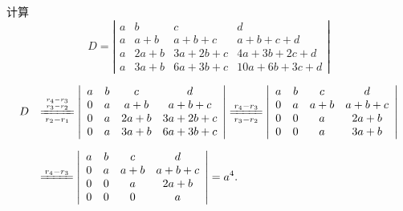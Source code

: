 \begin{li}
  计算
  $$
  D = \left |
    \begin{array}{cccc}
      a &    b &       c &           d  \\
      a &  a+b &   a+b+c &     a+b+c+d  \\
      a & 2a+b & 3a+2b+c &  4a+3b+2c+d  \\
      a & 3a+b & 6a+3b+c & 10a+6b+3c+d   
    \end{array}
  \right|
  $$
\end{li}
\begin{jie}
  $$
  \begin{array}{ll}
    D &  \ds \xlongequal[r_2-r_1]{r_4-r_3\atop r_3-r_2}
        \left |
        \begin{array}{cccc}
          a &    b &     c &         d  \\
          0 &    a &   a+b &     a+b+c  \\
          0 &    a &  2a+b &   3a+2b+c  \\
          0 &    a &  3a+b &   6a+3b+c   
        \end{array}\right| \xlongequal[r_3-r_2]{r_4-r_3}\left |
                             \begin{array}{cccc}
                               a &    b &     c &         d  \\
                               0 &    a &   a+b &     a+b+c  \\
                               0 &    0 &     a &      2a+b  \\
                               0 &    0 &     a &      3a+b   
                             \end{array}
                                                  \right|
    \\[1.0cm]
      &  \ds \xlongequal{r_4-r_3} \left |
        \begin{array}{cccc}
          a &    b &     c &         d  \\
          0 &    a &   a+b &     a+b+c  \\
          0 &    0 &     a &      2a+b  \\
          0 &    0 &     0 &         a   
        \end{array}
                             \right| = a^4.      
  \end{array}
  $$
\end{jie}

